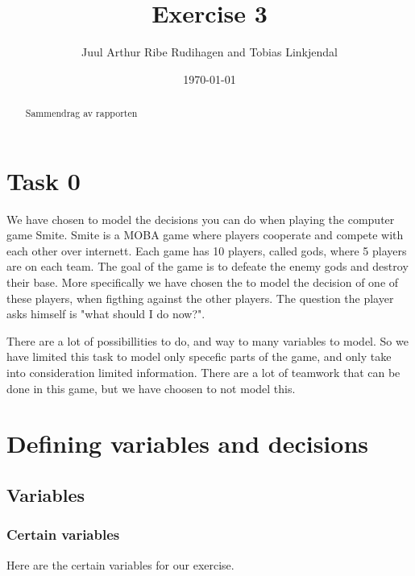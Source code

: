 \documentclass[titlepage]{article}
\author{Juul Arthur Ribe Rudihagen and Tobias Linkjendal}
\title{Exercise 3}
\date{\today}
\begin{document}
\maketitle

\renewcommand{\abstractname}{Summary}
\begin{abstract}
Sammendrag av rapporten
\end{abstract}

\tableofcontents

\newpage


\section{Task 0}
We have chosen to model the decisions you can do when playing the computer game Smite. Smite is a MOBA game where players cooperate and compete with each other over internett. Each game has 10 players, called gods, where 5 players are on each team. The goal of the game is to defeate the enemy gods and destroy their base. More specifically we have chosen the to model the decision of one of these players, when figthing against the other players. The question the player asks himself is "what should I do now?".

There are a lot of possibillities to do, and way to many variables to model. So we have limited this task to model only specefic parts of the game, and only take into consideration limited information. There are a lot of teamwork that can be done in this game, but we have choosen to not model this.

\newpage


\section{Defining variables and decisions}

\subsection{Variables}
\subsubsection{Certain variables}
Here are the certain variables for our exercise. 
\end{document}
